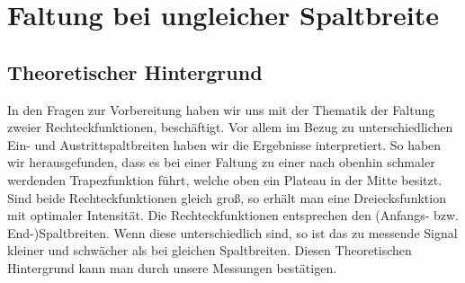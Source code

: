 \section{Faltung bei ungleicher Spaltbreite}
\subsection {Theoretischer Hintergrund}
In den Fragen zur Vorbereitung haben wir uns mit der Thematik der Faltung zweier Rechteckfunktionen, besch\"aftigt. Vor allem im Bezug zu unterschiedlichen Ein- und Austrittspaltbreiten haben wir die 
Ergebnisse interpretiert. So haben wir herausgefunden, dass es bei einer Faltung zu einer nach obenhin schmaler werdenden Trapezfunktion f\"uhrt, welche oben ein Plateau in der Mitte besitzt. \\
Sind beide Rechteckfunktionen gleich gro\ss{}, so erh\"alt man eine Dreiecksfunktion mit optimaler Intensit\"at. Die Rechteckfunktionen entsprechen den (Anfangs- bzw. End-)Spaltbreiten. Wenn diese 
unterschiedlich sind, so ist das zu messende Signal kleiner und schw\"acher als bei gleichen Spaltbreiten. Diesen Theoretischen Hintergrund kann man durch unsere Messungen best\"atigen. 

